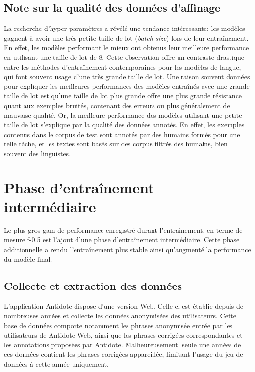 \documentclass[12pt,twoside,maitrise]{dms}
\theoremstyle{definition}
\numberwithin{equation}{section}
\numberwithin{table}{chapter}
\numberwithin{figure}{chapter}
\begin{document}

\subsection{Note sur la qualité des données d'affinage}
La recherche d'hyper-paramètres a révélé une tendance intéressante:
les modèles gagnent à avoir une très petite taille de lot
(\textit{batch size}) lors de leur entraînement. En effet, les modèles
performant le mieux ont obtenus leur meilleure performance en
utilisant une taille de lot de 8. Cette observation offre un contraste
drastique entre les méthodes d'entraînement contemporaines pour les
modèles de langue, qui font souvent usage d'une très grande taille de
lot. Une raison souvent données pour expliquer les meilleures
performances des modèles entraînés avec une grande taille de lot est
qu'une taille de lot plus grande offre une plus grande résistance
quant aux exemples bruités, contenant des erreurs ou plus généralement
de mauvaise qualité. Or, la meilleure performance des modèles
utilisant une petite taille de lot s'explique par la qualité des
données annotés. En effet, les exemples contenus dans le corpus de
test sont annotés par des humains formés pour une telle tâche, et les
textes sont basés sur des corpus filtrés des humains, bien souvent des
linguistes.
\section{Phase d'entraînement intermédiaire}
Le plus gros gain de performance enregistré durant l'entraînement, en
terme de mesure f-0.5 est l'ajout d'une phase d'entraînement
intermédiaire. Cette phase additionnelle a rendu l'entraînement plus
stable ainsi qu'augmenté la performance du modèle final.
\subsection{Collecte et extraction des données}
L'application Antidote dispose d'une version Web. Celle-ci est établie
depuis de nombreuses années et collecte les données anonymisées des
utilisateurs. Cette base de données comporte notamment les phrases
anonymisée entrée par les utilisateurs de Antidote Web, ainsi que les
phrases corrigées correspondantes et les annotations proposées par
Antidote.
Malheureusement, seule une années de ces données contient
les phrases corrigées appareillée, limitant l'usage du jeu de données
à cette année uniquement.
\end{document}
